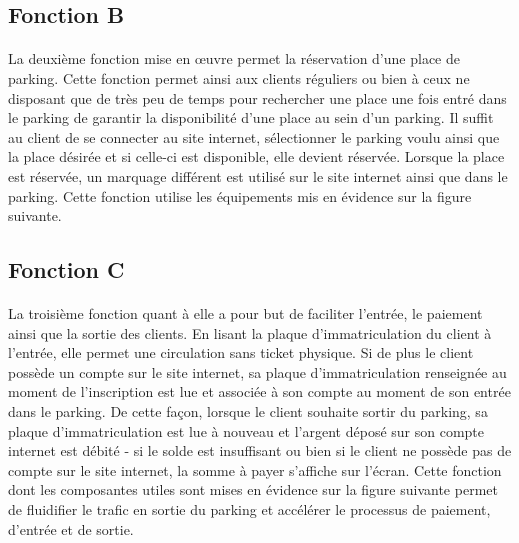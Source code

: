 

\subsection{Fonction B}

\paragraph*{}
La deuxième fonction mise en \oe{}uvre permet la réservation d'une place de parking. Cette fonction permet ainsi aux clients réguliers ou bien à ceux ne disposant que de très peu de temps pour rechercher une place une fois entré dans le parking de garantir la disponibilité d'une place au sein d'un parking. Il suffit au client de se connecter au site internet, sélectionner le parking voulu ainsi que la place désirée et si celle-ci est disponible, elle devient réservée. Lorsque la place est réservée, un marquage différent est utilisé sur le site internet ainsi que dans le parking. Cette fonction utilise les équipements mis en évidence sur la figure suivante.



\subsection{Fonction C}

\paragraph*{}
La troisième fonction quant à elle a pour but de faciliter l'entrée, le paiement ainsi que la sortie des clients. En lisant la plaque d'immatriculation du client à l'entrée, elle permet une circulation sans ticket physique. Si de plus le client possède un compte sur le site internet, sa plaque d'immatriculation renseignée au moment de l'inscription est lue et associée à son compte au moment de son entrée dans le parking. De cette façon, lorsque le client souhaite sortir du parking, sa plaque d'immatriculation est lue à nouveau et l'argent déposé sur son compte internet est débité - si le solde est insuffisant ou bien si le client ne possède pas de compte sur le site internet, la somme à payer s'affiche sur l'écran. Cette fonction dont les composantes utiles sont mises en évidence sur la figure suivante permet de fluidifier le trafic en sortie du parking et accélérer le processus de paiement, d'entrée et de sortie.

